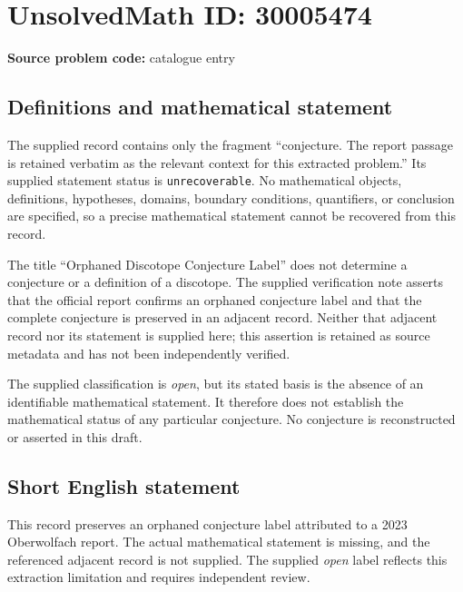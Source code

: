 \documentclass[11pt]{article}
\begin{document}
\section*{UnsolvedMath ID: 30005474}
\textbf{Source problem code:} catalogue entry
\subsection{Definitions and mathematical statement}
The supplied record contains only the fragment ``conjecture. The report passage is retained verbatim as the relevant context for this extracted problem.'' Its supplied statement status is \texttt{unrecoverable}. No mathematical objects, definitions, hypotheses, domains, boundary conditions, quantifiers, or conclusion are specified, so a precise mathematical statement cannot be recovered from this record.

The title ``Orphaned Discotope Conjecture Label'' does not determine a conjecture or a definition of a discotope. The supplied verification note asserts that the official report confirms an orphaned conjecture label and that the complete conjecture is preserved in an adjacent record. Neither that adjacent record nor its statement is supplied here; this assertion is retained as source metadata and has not been independently verified.

The supplied classification is \emph{open}, but its stated basis is the absence of an identifiable mathematical statement. It therefore does not establish the mathematical status of any particular conjecture. No conjecture is reconstructed or asserted in this draft.
\subsection{Short English statement}
This record preserves an orphaned conjecture label attributed to a 2023 Oberwolfach report. The actual mathematical statement is missing, and the referenced adjacent record is not supplied. The supplied \emph{open} label reflects this extraction limitation and requires independent review.
\end{document}

